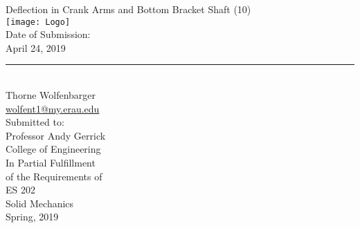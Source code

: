 \begin{center}
  {\huge Deflection in Crank Arms and Bottom Bracket Shaft (10)}\\
  \vspace{10px}
  \texttt{[image: Logo]} \\
  Date of Submission:\\
  April 24, 2019\\
  \vspace{30px}
  \rule{300px}{0.5px} \\
  Thorne Wolfenbarger \\
  \href{mailto:wolfent1@my.erau.edu}{wolfent1@my.erau.edu} \\
  \vspace{30px}
  Submitted to: \\
  Professor Andy Gerrick \\
  College of Engineering \\
  \vspace{40px}
  In Partial Fulfillment \\
  of the Requirements of \\
  \vspace{10px}
  ES 202 \\
  Solid Mechanics \\
  Spring, 2019 \\
\end{center}

